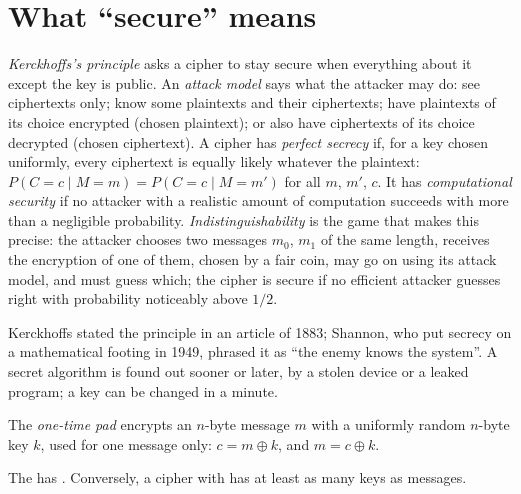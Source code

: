 \section{What ``secure'' means}\label{sec:b3:symmetric-cryptography:security}

\begin{definition}\label{def:b3:symmetric-cryptography:security}
\emph{Kerckhoffs's principle} asks a cipher to stay secure when everything about it except the key is public. An \emph{attack model} says what the attacker may do: see ciphertexts only; know some plaintexts and their ciphertexts; have plaintexts of its choice encrypted (chosen plaintext); or also have ciphertexts of its choice decrypted (chosen ciphertext). A cipher has \emph{perfect secrecy} if, for a key chosen uniformly, every ciphertext is equally likely whatever the plaintext: $P(C = c \mid M = m) = P(C = c \mid M = m')$ for all $m$, $m'$, $c$. It has \emph{computational security} if no attacker with a realistic amount of computation succeeds with more than a negligible probability. \emph{Indistinguishability} is the game that makes this precise: the attacker chooses two messages $m_0$, $m_1$ of the same length, receives the encryption of one of them, chosen by a fair coin, may go on using its attack model, and must guess which; the cipher is secure if no efficient attacker guesses right with probability noticeably above $1/2$.
\end{definition}

Kerckhoffs stated the principle in an article of 1883; Shannon, who put secrecy on a mathematical footing in 1949, phrased it as ``the enemy knows the system''. %
A secret algorithm is found out sooner or later, by a stolen device or a leaked program; a key can be changed in a minute.

\begin{definition}\label{def:b3:symmetric-cryptography:otp}
The \emph{one-time pad} encrypts an $n$-byte message $m$ with a uniformly random $n$-byte key $k$, used for one message only: $c = m \oplus k$, and $m = c \oplus k$.
\end{definition}

\begin{theorem}\label{thm:b3:symmetric-cryptography:shannon}
The  has . Conversely, a cipher with  has at least as many keys as messages.
\end{theorem}


